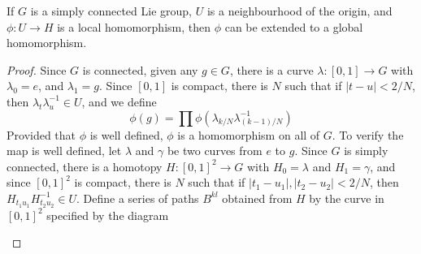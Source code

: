 \begin{theorem}
    If $G$ is a simply connected Lie group, $U$ is a neighbourhood of the origin, and $\phi: U \to H$ is a local homomorphism, then $\phi$ can be extended to a global homomorphism.
\end{theorem}
\begin{proof}
    Since $G$ is connected, given any $g \in G$, there is a curve $\lambda: [0,1] \to G$ with $\lambda_0 = e$, and $\lambda_1 = g$. Since $[0,1]$ is compact, there is $N$ such that if $|t - u| < 2/N$, then $\lambda_t \lambda_u^{-1} \in U$, and we define
    \[ \phi(g) = \prod \phi(\lambda_{k/N} \lambda_{(k-1)/N}^{-1}) \]
    Provided that $\phi$ is well defined, $\phi$ is a homomorphism on all of $G$. To verify the map is well defined, let $\lambda$ and $\gamma$ be two curves from $e$ to $g$. Since $G$ is simply connected, there is a homotopy $H: [0,1]^2 \to G$ with $H_0 = \lambda$ and $H_1 = \gamma$, and since $[0,1]^2$ is compact, there is $N$ such that if $|t_1 - u_1|, |t_2 - u_2| < 2/N$, then $H_{t_1u_1} H_{t_2u_2}^{-1} \in U$. Define a series of paths $B^{kl}$ obtained from $H$ by the curve in $[0,1]^2$ specified by the diagram

    \begin{center}
\end{center}
\end{proof}

